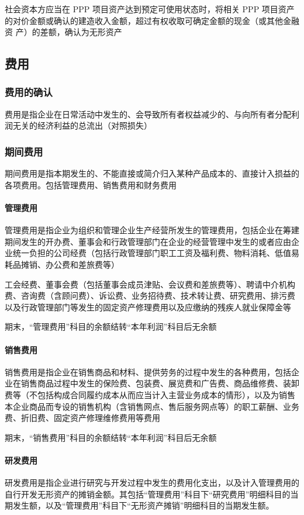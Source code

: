 \documentclass[UTF8,12pt]{ctexart}
\numberwithin{equation}{section} %
\numberwithin{figure}{section}
\numberwithin{table}{section}
\begin{document}
	社会资本方应当在 PPP 项目资产达到预定可使用状态时，将相关 PPP 项目资产的对价金额或确认的建造收入金额，超过有权收取可确定金额的现金（或其他金融资 产）的差额，确认为无形资产
	
	\subsection{费用}
	\subsubsection{费用的确认}
	费用是指企业在日常活动中发生的、会导致所有者权益减少的、与向所有者分配利润无关的经济利益的总流出（对照损失）
	
	\subsubsection{期间费用}
	期间费用是指本期发生的、不能直接或简介归入某种产品成本的、直接计入损益的各项费用。包括管理费用、销售费用和财务费用
	
	\paragraph{管理费用}
	管理费用是指企业为组织和管理企业生产经营所发生的管理费用，包括企业在筹建期间发生的开办费、董事会和行政管理部门在企业的经营管理中发生的或者应由企业统一负担的公司经费（包括行政管理部门职工工资及福利费、物料消耗、低值易耗品摊销、办公费和差旅费等）
	
	工会经费、董事会费（包括董事会成员津贴、会议费和差旅费等）、聘请中介机构费、咨询费（含顾问费）、诉讼费、业务招待费、技术转让费、研究费用、排污费以及行政管理部门等发生的固定资产修理费用以及应缴纳的残疾人就业保障金等
	
	期末，“管理费用”科目的余额结转“本年利润”科目后无余额
	
	\paragraph{销售费用}
	销售费用是指企业在销售商品和材料、提供劳务的过程中发生的各种费用，包括企业在销售商品过程中发生的保险费、包装费、展览费和广告费、商品维修费、装卸费等（不包括构成合同履约成本从而应当计入主营业务成本的情形），以及为销售本企业商品而专设的销售机构（含销售网点、售后服务网点等）的职工薪酬、业务费、折旧费、固定资产修理维修费用等费用
	
	期末，“销售费用”科目的余额结转“本年利润”科目后无余额
	
	\paragraph{研发费用}
	研发费用是指企业进行研究与开发过程中发生的费用化支出，以及计入管理费用的自行开发无形资产的摊销金额。其包括“管理费用”科目下“研究费用”明细科目的当期发生额，以及“管理费用”科目下“无形资产摊销”明细科目的当期发生额。
	
\end{document}
